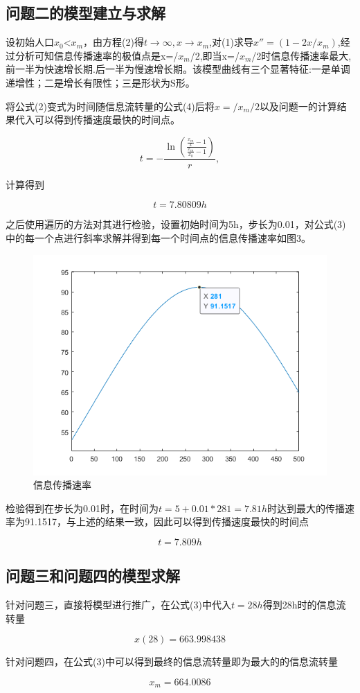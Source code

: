 \documentclass[UTF8]{ctexart}
\begin{document}
\subsection{问题二的模型建立与求解}
设初始人口$x_0$<$x_m$，由方程(2)得$t\rightarrow \infty ,x\rightarrow x_m$,对(1)求导$x''=\left( 1-2x/x_m \right) $,经过分析可知信息传播速率的极值点是x=/$x_m$/2,即当x=/$x_m$/2时信息传播速率最大,前一半为快速增长期.后一半为慢速增长期。该模型曲线有三个显著特征:一是单调递增性；二是增长有限性；三是形状为S形。\par
将公式(2)变式为时间随信息流转量的公式(4)后将$x=/x_m/2$以及问题一的计算结果代入可以得到传播速度最快的时间点。\par
\begin{equation}
	t=-\frac{\ln \left( \frac{\frac{x_m}{x}-1}{\frac{x_m}{x_0}-1} \right)}{r},
\end{equation}\par
计算得到\par
$$
t=7.80809h
$$\par
之后使用遍历的方法对其进行检验，设置初始时间为5h，步长为0.01，对公式(3)中的每一个点进行斜率求解并得到每一个时间点的信息传播速率如图3。
\begin{figure}[h]
	\centering
	\includegraphics[scale=0.9]{信息传播速率.png}
	\caption{信息传播速率}
\end{figure}\par
检验得到在步长为0.01时，在时间为$t=5+0.01*281=7.81h$时达到最大的传播速率为91.1517，与上述的结果一致，因此可以得到传播速度最快的时间点\par
$$
t=7.809h
$$\par
\subsection{问题三和问题四的模型求解}
针对问题三，直接将模型进行推广，在公式(3)中代入$t=28h$得到28h时的信息流转量\par
$$
x(28)=663.998438
$$\par
针对问题四，在公式(3)中可以得到最终的信息流转量即为最大的的信息流转量\par
$$
x_m=664.0086
$$
\end{document}

